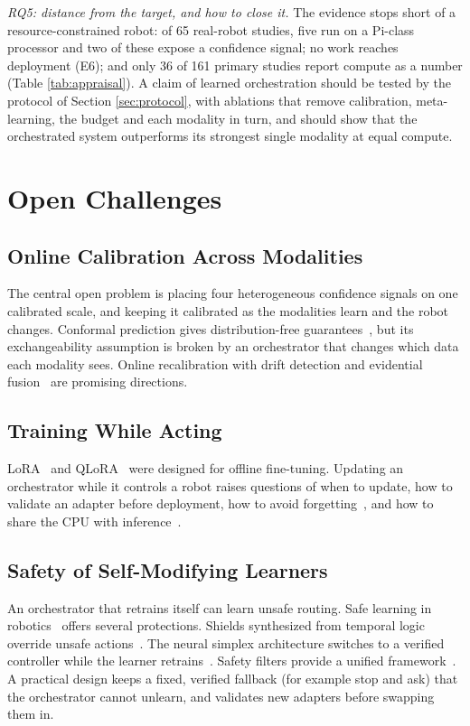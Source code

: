 \documentclass[journal]{IEEEtran}
\begin{document}
\textit{RQ5: distance from the target, and how to close it.} The evidence stops short of a resource-constrained robot: of 65 real-robot studies, five run on a Pi-class processor and two of these expose a confidence signal; no work reaches deployment (E6); and only 36 of 161 primary studies report compute as a number (Table \ref{tab:appraisal}). A claim of learned orchestration should be tested by the protocol of Section \ref{sec:protocol}, with ablations that remove calibration, meta-learning, the budget and each modality in turn, and should show that the orchestrated system outperforms its strongest single modality at equal compute.


\section{Open Challenges}\label{sec:challenges}

\subsection{Online Calibration Across Modalities}\label{sec:ch-calib}
The central open problem is placing four heterogeneous confidence signals on one calibrated scale, and keeping it calibrated as the modalities learn and the robot changes. Conformal prediction gives distribution-free guarantees~\cite{Ren2023,Lindemann2023}, but its exchangeability assumption is broken by an orchestrator that changes which data each modality sees. Online recalibration with drift detection and evidential fusion~\cite{Han2022a} are promising directions.


\subsection{Training While Acting}\label{sec:ch-lora}
LoRA~\cite{Hu2022} and QLoRA~\cite{Dettmers2023} were designed for offline fine-tuning. Updating an orchestrator while it controls a robot raises questions of when to update, how to validate an adapter before deployment, how to avoid forgetting~\cite{Kirkpatrick2017,Rolnick2019}, and how to share the CPU with inference~\cite{Zhu2023,Cadene2026}.


\subsection{Safety of Self-Modifying Learners}\label{sec:ch-safety}
An orchestrator that retrains itself can learn unsafe routing. Safe learning in robotics~\cite{Brunke2022,Garcia2015} offers several protections. Shields synthesized from temporal logic override unsafe actions~\cite{Alshiekh2018}. The neural simplex architecture switches to a verified controller while the learner retrains~\cite{Phan2020}. Safety filters provide a unified framework~\cite{Hsu2024,Wabersich2023}. A practical design keeps a fixed, verified fallback (for example stop and ask) that the orchestrator cannot unlearn, and validates new adapters before swapping them in.
\end{document}

